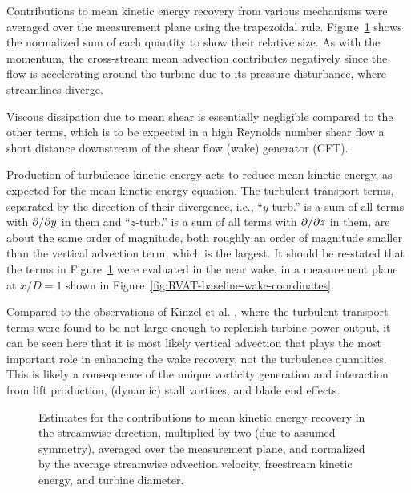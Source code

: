 Contributions to mean kinetic energy recovery from various mechanisms were
averaged over the  measurement plane using the trapezoidal rule.
Figure~\ref{fig:RVAT-baseline-Kbargraph} shows the normalized sum of each
quantity to show their relative size. As with the momentum, the cross-stream
mean advection contributes negatively since the flow is accelerating around the
turbine due to its pressure disturbance, where streamlines diverge.

Viscous dissipation due to mean shear is essentially negligible compared to
the other terms, which is to be expected in a high Reynolds number shear flow a 
short distance downstream of the shear flow (wake) generator (CFT).

Production of turbulence kinetic energy acts to reduce mean kinetic energy, as
expected for the mean kinetic energy equation. The turbulent transport terms,
separated by the direction of their divergence, i.e., ``$y$-turb.'' is a sum of
all terms with $\partial / \partial y$ in them and ``$z$-turb.'' is a sum of all terms with
$\partial / \partial z$ in them, are about the same order of magnitude, both roughly an
order of magnitude smaller than the vertical advection term, which is the
largest. It should be re-stated that the terms in
Figure~\ref{fig:RVAT-baseline-Kbargraph} were evaluated in the near wake, in a
measurement plane at $x/D=1$ shown in
Figure~\ref{fig:RVAT-baseline-wake-coordinates}.

Compared to the observations of Kinzel et al. \cite{Kinzel2012}, where the
turbulent transport terms were found to be not large enough to replenish turbine
power output, it can be seen here that it is most likely vertical advection that
plays the most important role in enhancing the wake recovery, not the turbulence
quantities. This is likely a consequence of the unique vorticity generation and
interaction from lift production, (dynamic) stall vortices, and blade end
effects.

\begin{figure}
    \centering
    

    \caption{Estimates for the contributions to mean kinetic energy recovery in
        the streamwise direction, multiplied by two (due to assumed symmetry),
        averaged over the measurement plane, and normalized by the average
        streamwise advection velocity, freestream kinetic energy, and turbine
        diameter.}
    
    \label{fig:RVAT-baseline-Kbargraph}
\end{figure}


